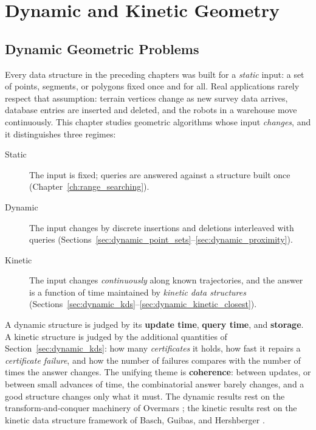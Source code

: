 \chapter{Dynamic and Kinetic Geometry}
\label{ch:dynamic_kinetic_geometry}

\section{Dynamic Geometric Problems}
\label{sec:dynamic_intro}

Every data structure in the preceding chapters was built for a \emph{static}
input: a set of points, segments, or polygons fixed once and for all. Real
applications rarely respect that assumption: terrain vertices change as new
survey data arrives, database entries are inserted and deleted, and the
robots in a warehouse move continuously. This chapter studies geometric
algorithms whose input \emph{changes}, and it distinguishes three regimes:

\begin{description}
  \item[Static] The input is fixed; queries are answered against a structure
    built once (Chapter~\ref{ch:range_searching}).
  \item[Dynamic] The input changes by discrete insertions and deletions
    interleaved with queries (Sections~\ref{sec:dynamic_point_sets}--\ref{sec:dynamic_proximity}).
  \item[Kinetic] The input changes \emph{continuously} along known
    trajectories, and the answer is a function of time maintained by
    \emph{kinetic data structures} (Sections~\ref{sec:dynamic_kds}--\ref{sec:dynamic_kinetic_closest}).
\end{description}

A dynamic structure is judged by its \textbf{update time},
\textbf{query time}, and \textbf{storage}. A kinetic structure is judged by
the additional quantities of Section~\ref{sec:dynamic_kds}: how many
\emph{certificates} it holds, how fast it repairs a \emph{certificate
failure}, and how the number of failures compares with the number of times
the answer changes. The unifying theme is \textbf{coherence}:
between updates, or between small advances of time, the combinatorial answer
barely changes, and a good structure changes only what it must. The dynamic
results rest on the transform-and-conquer machinery of Overmars
\cite{overmars1983}; the kinetic results rest on the kinetic data structure
framework of Basch, Guibas, and Hershberger \cite{basch1999,guibas1998}.

